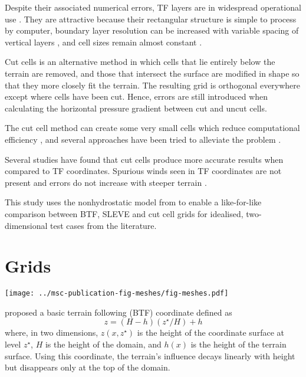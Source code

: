 \documentclass[twocol]{ametsoc}
\begin{document}
Despite their associated numerical errors, TF layers are in widespread operational use \citep{steppeler2003}.  They are attractive because their rectangular structure is simple to process by computer, boundary layer resolution can be increased with variable spacing of vertical layers \citep{schaer2002}, and cell sizes remain almost constant \citep{jebens2011}.

Cut cells is an alternative method in which cells that lie entirely below the terrain are removed, and those that intersect the surface are modified in shape so that they more closely fit the terrain.  The resulting grid is orthogonal everywhere except where cells have been cut.  Hence, errors are still introduced when calculating the horizontal pressure gradient between cut and uncut cells.

The cut cell method can create some very small cells which reduce computational efficiency \citep{klein2009}, and several approaches have been tried to alleviate the problem \citep{steppeler2002,yamazaki-satomura2010,jebens2011}.

Several studies have found that cut cells produce more accurate results when compared to TF coordinates.  Spurious winds seen in TF coordinates are not present and errors do not increase with steeper terrain \citep{good2014}.  

This study uses the nonhydrostatic model from \citet{weller-shahrokhi2014} to enable a like-for-like comparison between BTF, SLEVE and cut cell grids for idealised, two-dimensional test cases from the literature.  

\section{Grids}
\label{sec:grid}

\begin{figure*}
	\centering
	\texttt{[image: ../msc-publication-fig-meshes/fig-meshes.pdf]}
	\caption{Examples of (a) BTF, (b) SLEVE, and (c) a cut cell grid, all constructed with OpenFOAM.  The two dimensional grids are \SI{20}{\kilo\meter} wide and \SI{2}{\kilo\meter} high.  The cut cell grid was created by intersecting the terrain surface with a regular grid as described in section~\ref{sec:grid}.}
	\label{fig:grid}
\end{figure*}

\citet{galchen-somerville1975} proposed a basic terrain following (BTF) coordinate defined as 
\begin{equation}
	z = \left( H - h \right) \left( z^\star / H \right) + h \label{eqn:btf}
\end{equation}
where, in two dimensions, \(z(x, z^\star)\) is the height of the coordinate surface at level \(z^\star\), \(H\) is the height of the domain, and \(h(x)\) is the height of the terrain surface.  Using this coordinate, the terrain's influence decays linearly with height but disappears only at the top of the domain.
\end{document}
